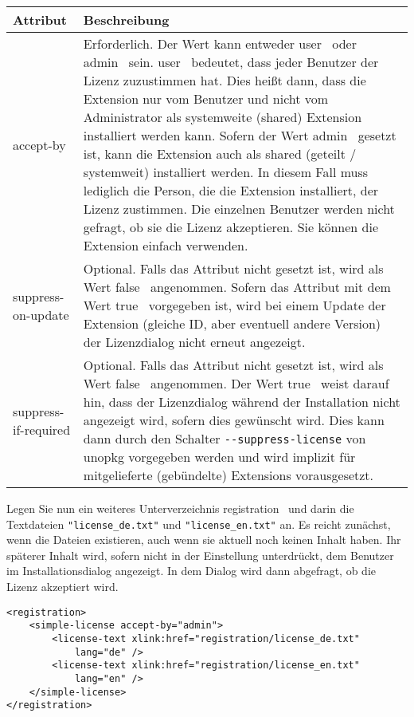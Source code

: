 \documentclass[a4paper,10pt,pagesize,titlepage]{scrbook}
\begin{document}
\begin{tabular}{|p{3.5cm}|p{8.3cm}|}
	\hline \rowcolor{hellgrau} \rule[-3ex]{0pt}{5.5ex}  Attribut & Beschreibung \\
	\hline \rule[-3ex]{0pt}{5.5ex} accept-by & Erforderlich. Der Wert kann entweder \glqq user\grqq~ oder \glqq admin\grqq~ sein. \glqq user\grqq~ bedeutet, dass jeder Benutzer der Lizenz zuzustimmen hat. Dies heißt dann, dass die Extension nur vom Benutzer und nicht vom Administrator als systemweite (shared) Extension installiert werden kann. Sofern der Wert \glqq admin\grqq~ gesetzt ist, kann die Extension auch als shared (geteilt / systemweit) installiert werden. In diesem Fall muss lediglich die Person, die die Extension installiert, der Lizenz zustimmen. Die einzelnen Benutzer werden nicht gefragt, ob sie die Lizenz akzeptieren. Sie können die Extension einfach verwenden.\\
	\hline \rule[-3ex]{0pt}{5.5ex}	suppress-on-update & Optional. Falls das Attribut nicht gesetzt ist, wird als Wert \glqq false\grqq~ angenommen. Sofern das Attribut mit dem Wert \glqq true\grqq~ vorgegeben ist, wird bei einem Update der Extension (gleiche ID, aber eventuell andere Version) der Lizenzdialog nicht erneut angezeigt.\\
	\hline \rule[-3ex]{0pt}{5.5ex}	suppress-if-required & Optional. Falls das Attribut nicht gesetzt ist, wird als Wert \glqq false\grqq~ angenommen. Der Wert \glqq true\grqq~ weist darauf hin, dass der Lizenzdialog während der Installation nicht angezeigt wird, sofern dies gewünscht wird. Dies kann dann durch den Schalter  \verb|--suppress-license| von unopkg vorgegeben werden und wird implizit für mitgelieferte (gebündelte) Extensions vorausgesetzt.\\
	\bottomrule
	
\end{tabular}

\bigskip
\bigskip
Legen Sie nun ein weiteres Unterverzeichnis \glqq registration\grqq~ und darin die Textdateien \verb|"license_de.txt"| und \verb|"license_en.txt"| an. Es reicht zunächst, wenn die Dateien existieren, auch wenn sie aktuell noch keinen Inhalt haben. Ihr späterer Inhalt wird, sofern nicht in der Einstellung unterdrückt, dem Benutzer im Installationsdialog angezeigt. In dem Dialog wird dann abgefragt, ob die Lizenz akzeptiert wird.
\newpage
\begin{lstlisting}
<registration>
    <simple-license accept-by="admin">
        <license-text xlink:href="registration/license_de.txt" 
            lang="de" />
        <license-text xlink:href="registration/license_en.txt" 
            lang="en" />
    </simple-license>
</registration>
\end{lstlisting}
\end{document}
